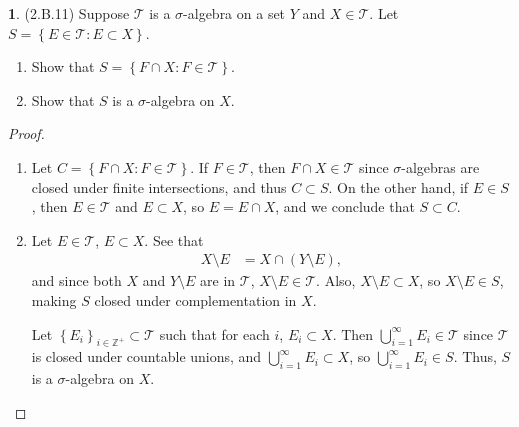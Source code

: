 \documentclass[12pt]{article}
\theoremstyle{definition}
\newtheorem{ex}{}
\begin{document}
\begin{ex}
	(2.B.11)
	Suppose $\mathcal{T}$ is a $\sigma$-algebra on a set $Y$ and $X \in \mathcal{T}$.
	Let $S = \left\lbrace E \in \mathcal{T} : E \subset X \right\rbrace$. \begin{enumerate}[label=(\alph*)]
		\item Show that $S = \left\lbrace F \cap X : F \in \mathcal{T} \right\rbrace$.
		\item Show that $S$ is a $\sigma$-algebra on $X$.
	\end{enumerate}
\end{ex}
\begin{proof}
	\begin{enumerate}[label=(\alph*)]
		\item Let $C = \left\lbrace F \cap X : F \in \mathcal{T} \right\rbrace$.
		      If $F \in \mathcal{T}$, then $F \cap X \in \mathcal{T}$ since $\sigma$-algebras are closed under finite intersections, and thus $C \subset S$.
		      On the other hand, if $E \in S$, then $E \in \mathcal{T}$ and $E \subset X$, so $E = E \cap X$, and we conclude that $S \subset C$.
		\item Let $E \in \mathcal{T}$, $E \subset X$.
		      See that \begin{align*}
			      X \setminus E & = X \cap (Y \setminus E),
		      \end{align*}
		      and since both $X$ and $Y \setminus E$ are in $\mathcal{T}$, $X \setminus E \in \mathcal{T}$.
		      Also, $X \setminus E \subset X$, so $X \setminus E \in S$, making $S$ closed under complementation in $X$.

		      Let $\left\lbrace E_i \right\rbrace_{i \in \mathbb{Z}^+} \subset \mathcal{T}$ such that for each $i$, $E_i \subset X$.
		      Then $\bigcup_{i=1}^\infty E_i \in \mathcal{T}$ since $\mathcal{T}$ is closed under countable unions, and $\bigcup_{i = 1}^\infty E_i \subset X$, so $\bigcup_{i = 1}^\infty E_i \in S$.
		      Thus, $S$ is a $\sigma$-algebra on $X$.
	\end{enumerate}
\end{proof}
\end{document}
